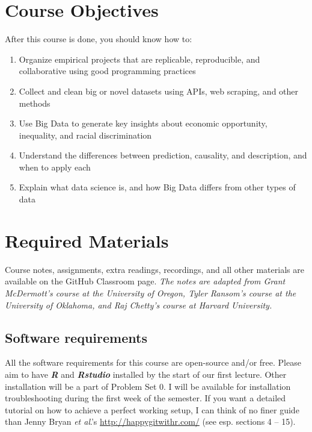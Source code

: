 \documentclass[11pt]{article}
\begin{document}
\section*{Course Objectives}

After this course is done, you should know how to:

\begin{enumerate}
\item Organize empirical projects that are replicable, reproducible, and collaborative using good programming practices
\item Collect and clean big or novel datasets using APIs, web scraping, and other methods
\item Use Big Data to generate key insights about economic opportunity, inequality, and racial discrimination
\item Understand the differences between prediction, causality, and description, and when to apply each
\item Explain what data science is, and how Big Data differs from other types of data 
\end{enumerate}


\section*{Required Materials}
\label{sec:materials}

Course notes, assignments, extra readings, recordings, and all other materials are available on the GitHub Classroom page. \textit{The notes are adapted from Grant McDermott's course at the University of Oregon, Tyler Ransom's course at the University of Oklahoma, and Raj Chetty's course at Harvard University.}

\subsection*{Software requirements}

All the software requirements for this course are open-source and/or free. Please aim to have \textbf{\textit{R}} and \textbf{\textit{Rstudio}} installed by the start of our first lecture. Other installation will be a part of Problem Set 0. I will be available for installation troubleshooting during the first week of the semester. If you want a detailed tutorial on how to achieve a perfect working setup, I can think of no finer guide than Jenny Bryan \textit{et al}.'s \url{http://happygitwithr.com/} (see esp. sections 4 -- 15).
\end{document}
